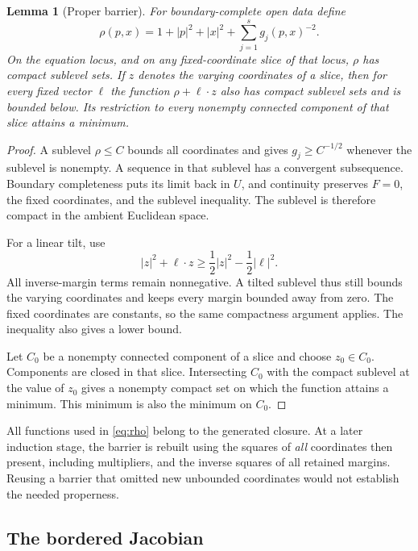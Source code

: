 \documentclass[11pt]{article}
\newtheorem{lemma}[theorem]{Lemma}
\theoremstyle{definition}
\theoremstyle{remark}
\begin{document}
\begin{lemma}[Proper barrier]
\label{lem:proper}
For boundary-complete open data define
\begin{equation}
 \rho(p,x)=1+|p|^2+|x|^2+\sum_{j=1}^s g_j(p,x)^{-2}.
 \label{eq:rho}
\end{equation}
On the equation locus, and on any fixed-coordinate slice of that
locus, \(\rho\) has compact sublevel sets. If \(z\) denotes the varying
coordinates of a slice, then for every fixed vector \(\ell\) the
function \(\rho+\ell\cdot z\) also has compact sublevel sets and is
bounded below. Its restriction to every nonempty connected component
of that slice attains a minimum.
\end{lemma}

\begin{proof}
A sublevel \(\rho\le C\) bounds all coordinates and gives
\(g_j\ge C^{-1/2}\) whenever the sublevel is nonempty. A sequence in
that sublevel has a convergent subsequence. Boundary completeness puts
its limit back in \(U\), and continuity preserves \(F=0\), the fixed
coordinates, and the sublevel inequality. The sublevel is therefore
compact in the ambient Euclidean space.

For a linear tilt, use
\[
 |z|^2+\ell\cdot z
 \ge \frac12|z|^2-\frac12|\ell|^2.
\]
All inverse-margin terms remain nonnegative. A tilted sublevel thus
still bounds the varying coordinates and keeps every margin bounded
away from zero. The fixed coordinates are constants, so the same
compactness argument applies. The inequality also gives a lower bound.

Let \(C_0\) be a nonempty connected component of a slice and choose
\(z_0\in C_0\). Components are closed in that slice. Intersecting \(C_0\)
with the compact sublevel at the value of \(z_0\) gives a nonempty
compact set on which the function attains a minimum. This minimum is
also the minimum on \(C_0\).
\end{proof}

All functions used in \eqref{eq:rho} belong to the generated closure.
At a later induction stage, the barrier is rebuilt using the squares
of \emph{all} coordinates then present, including multipliers, and the
inverse squares of all retained margins. Reusing a barrier that omitted
new unbounded coordinates would not establish the needed properness.

\subsection{The bordered Jacobian}
\end{document}
